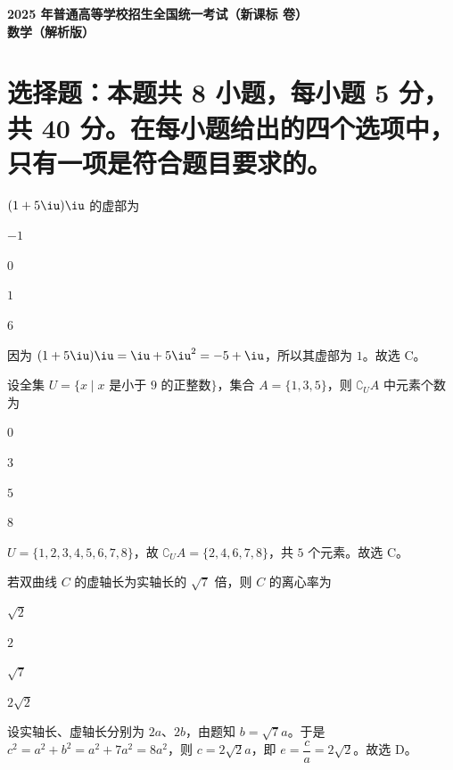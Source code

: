 \documentclass{exam-zh}
\begin{document}
\begin{center}
  {\bfseries 2025 年普通高等学校招生全国统一考试（新课标 \uppercase\expandafter{} 卷）}\\[4pt]
  {\bfseries 数\quad 学（解析版）}
\end{center}

\section{选择题：本题共 8 小题，每小题 5 分，共 40 分。在每小题给出的四个选项中，只有一项是符合题目要求的。}

\begin{question}
$(1+5\iu)\iu$ 的虚部为 \paren[C]
\begin{choices}
  \item $-1$
  \item $0$
  \item $1$
  \item $6$
\end{choices}
\begin{solution}
因为 $(1+5\iu)\iu=\iu+5\iu^{2}=-5+\iu$，所以其虚部为 $1$。故选 C。
\end{solution}
\end{question}

\begin{question}
设全集 $U=\{x\mid x\text{ 是小于 }9\text{ 的正整数}\}$，集合 $A=\{1,3,5\}$，则 $\complement_{U}A$ 中元素个数为 \paren[C]
\begin{choices}
  \item $0$
  \item $3$
  \item $5$
  \item $8$
\end{choices}
\begin{solution}
$U=\{1,2,3,4,5,6,7,8\}$，故 $\complement_{U}A=\{2,4,6,7,8\}$，共 $5$ 个元素。故选 C。
\end{solution}
\end{question}

\begin{question}
若双曲线 $C$ 的虚轴长为实轴长的 $\sqrt{7}$ 倍，则 $C$ 的离心率为 \paren[D]
\begin{choices}
  \item $\sqrt{2}$
  \item $2$
  \item $\sqrt{7}$
  \item $2\sqrt{2}$
\end{choices}
\begin{solution}
设实轴长、虚轴长分别为 $2a$、$2b$，由题知 $b=\sqrt{7}a$。于是 $c^{2}=a^{2}+b^{2}=a^{2}+7a^{2}=8a^{2}$，则 $c=2\sqrt{2}a$，即 $e=\dfrac{c}{a}=2\sqrt{2}$。故选 D。
\end{solution}
\end{question}
\end{document}
